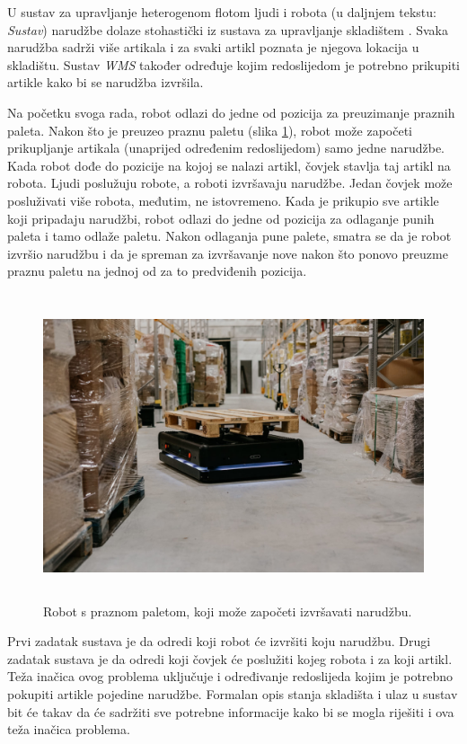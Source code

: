 \documentclass[times, utf8, seminar]{fer}
\begin{document}
U sustav za upravljanje heterogenom flotom ljudi i robota
(u daljnjem tekstu: \emph{Sustav}) narudžbe dolaze stohastički iz
sustava za upravljanje skladištem .
Svaka narudžba sadrži više artikala i za svaki artikl poznata je njegova lokacija u skladištu.
Sustav \emph{WMS} također određuje kojim redoslijedom je potrebno prikupiti artikle kako bi
se narudžba izvršila.

Na početku svoga rada, robot odlazi do jedne od pozicija za preuzimanje praznih
paleta. Nakon što je preuzeo praznu paletu (slika \ref{fig:robot-02}), robot može započeti prikupljanje artikala (unaprijed
određenim redoslijedom) samo jedne narudžbe.
Kada robot dođe do pozicije na kojoj se nalazi artikl, čovjek stavlja taj artikl na robota.
Ljudi poslužuju robote, a roboti izvršavaju narudžbe. Jedan čovjek može posluživati više robota,
međutim, ne istovremeno.
Kada
je prikupio sve artikle koji pripadaju narudžbi, robot odlazi do jedne od pozicija za odlaganje punih paleta i
tamo odlaže paletu. Nakon odlaganja pune palete, smatra se da je robot izvršio narudžbu i da
je spreman za izvršavanje nove nakon što ponovo preuzme praznu paletu na jednoj od za to predviđenih
pozicija.

\begin{figure}[htb]
    \centering
    \includegraphics[height=9cm]{images/robot-02.jpg}
    \caption{Robot s praznom paletom, koji može započeti izvršavati narudžbu. \citep{Gideon:PollDebunks}}
    \label{fig:robot-02}
\end{figure}

Prvi zadatak sustava je da odredi koji robot će izvršiti koju narudžbu.
Drugi zadatak sustava je da odredi koji čovjek će poslužiti kojeg robota
i za koji artikl.
Teža inačica ovog problema uključuje i određivanje redoslijeda kojim je potrebno pokupiti
artikle pojedine narudžbe. Formalan opis stanja skladišta i ulaz u sustav bit će takav da će
sadržiti sve potrebne informacije kako bi se mogla riješiti i ova teža inačica problema.
\end{document}
